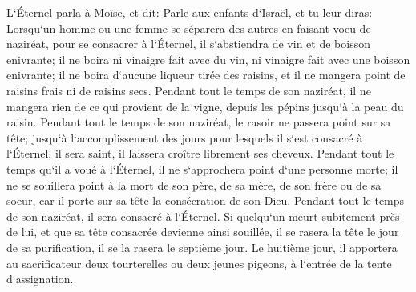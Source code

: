 \verse L`Éternel parla à Moïse, et dit: 
\verse Parle aux enfants d`Israël, et tu leur diras: Lorsqu`un homme ou une femme se séparera des autres en faisant voeu de naziréat, pour se consacrer à l`Éternel, 
\verse il s`abstiendra de vin et de boisson enivrante; il ne boira ni vinaigre fait avec du vin, ni vinaigre fait avec une boisson enivrante; il ne boira d`aucune liqueur tirée des raisins, et il ne mangera point de raisins frais ni de raisins secs. 
\verse Pendant tout le temps de son naziréat, il ne mangera rien de ce qui provient de la vigne, depuis les pépins jusqu`à la peau du raisin. 
\verse Pendant tout le temps de son naziréat, le rasoir ne passera point sur sa tête; jusqu`à l`accomplissement des jours pour lesquels il s`est consacré à l`Éternel, il sera saint, il laissera croître librement ses cheveux. 
\verse Pendant tout le temps qu`il a voué à l`Éternel, il ne s`approchera point d`une personne morte; 
\verse il ne se souillera point à la mort de son père, de sa mère, de son frère ou de sa soeur, car il porte sur sa tête la consécration de son Dieu. 
\verse Pendant tout le temps de son naziréat, il sera consacré à l`Éternel. 
\verse Si quelqu`un meurt subitement près de lui, et que sa tête consacrée devienne ainsi souillée, il se rasera la tête le jour de sa purification, il se la rasera le septième jour. 
\verse Le huitième jour, il apportera au sacrificateur deux tourterelles ou deux jeunes pigeons, à l`entrée de la tente d`assignation. 
